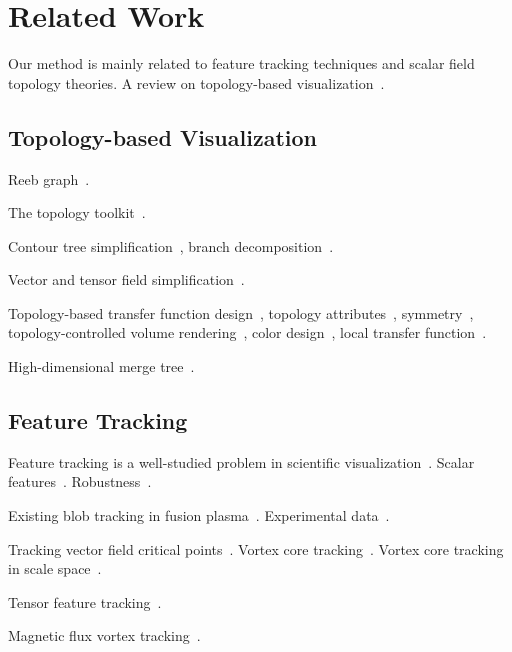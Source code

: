 \section{Related Work}
\label{sec:related}

Our method is mainly related to feature tracking techniques and scalar field topology theories.  A review on topology-based visualization~\cite{HeineLHIFSHG16}. 



\subsection{Topology-based Visualization}

Reeb graph~\cite{Reeb1946}.  

The topology toolkit~\cite{TiernyFLGM18}.  

Contour tree simplification~\cite{CarrSP04, KreveldOBPS97}, branch decomposition~\cite{Pascucci2004}.

Vector and tensor field simplification~\cite{TricocheSH00, TricocheSH01a, TricocheSHC01}.  

Topology-based transfer function design~\cite{FujishiroAT99}, topology attributes~\cite{TakeshimaTFN04}, symmetry~\cite{ThomasN11}, topology-controlled volume rendering~\cite{WeberDCPH07}, color design~\cite{ZhouT09}, local transfer function~\cite{GuoY13}.  

High-dimensional merge tree~\cite{OesterlingHWMS17}. 



\subsection{Feature Tracking}

Feature tracking is a well-studied problem in scientific visualization~\cite{PostVHLD2003}.  Scalar features~\cite{SilverW98}.  Robustness~\cite{SkrabaW14}.  

Existing blob tracking in fusion plasma~\cite{WuWSCCSCK16}.  Experimental data~\cite{DavisKMRSZ14}.  

Tracking vector field critical points~\cite{GarthTS04}.  Vortex core tracking~\cite{TheiselSWHS05}.  Vortex core tracking in scale space~\cite{BauerP02}.  

Tensor feature tracking~\cite{TricocheSH01, TricocheWSH02}.  

Magnetic flux vortex tracking~\cite{GuoPPKG16, GuoPG17, PhillipsGPKG16, PhillipsPKG15}.

